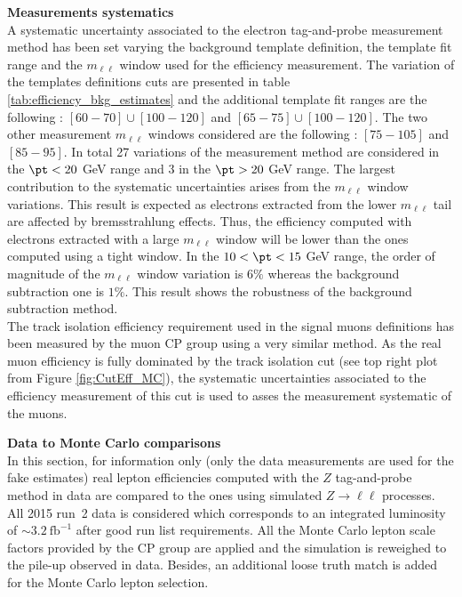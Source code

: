      
       \par{\bf Measurements systematics\\}
       A systematic uncertainty associated to the electron tag-and-probe measurement method has been set varying the background template definition, the template fit range and the $m_{\ell\ell}$ window used for the efficiency measurement. The variation of the templates definitions cuts are presented in table \ref{tab:efficiency_bkg_estimates} and the additional template fit ranges are the following : $[60-70]\cup[100-120]$ and $[65-75]\cup[100-120]$. The two other measurement $m_{\ell\ell}$ windows considered are the following : $[75-105]$ and $[85-95]$. In total 27 variations of the measurement method are considered in the $\pt < 20$ GeV range and 3 in the $\pt > 20$ GeV range. The largest contribution to the systematic uncertainties arises from the $m_{\ell\ell}$ window variations. This result is expected as electrons extracted from the lower $m_{\ell\ell}$ tail are affected by bremsstrahlung effects. Thus, the efficiency computed with electrons extracted with a large $m_{\ell\ell}$ window will be lower than the ones computed using a tight window. In the $10 < \pt < 15$ GeV range, the order of magnitude of the $m_{\ell\ell}$ window variation is $6\%$ whereas the background subtraction one is $1\%$. This result shows the robustness of the background subtraction method.\\
       The track isolation efficiency requirement used in the signal muons definitions has been measured by the muon CP group using a very similar method. As the real muon efficiency is fully dominated by the track isolation cut (see top right plot from Figure \ref{fig:CutEff_MC}), the systematic uncertainties associated to the efficiency measurement of this cut is used to asses the measurement systematic of the muons.


       \par{\bf Data to Monte Carlo comparisons\\}
       In this section, for information only (only the data measurements are used for the fake estimates) real lepton efficiencies computed with the $Z$ tag-and-probe method in data are compared to the ones using simulated $Z\rightarrow \ell\ell$ processes. All 2015 run~2 data is considered which corresponds to an integrated luminosity of $\sim3.2~\mathrm{fb}^{-1}$ after good run list requirements. All the Monte Carlo lepton scale factors provided by the CP group are applied and the simulation is reweighed to the pile-up observed in data. Besides, an additional loose truth match is added for the Monte Carlo lepton selection.
			
